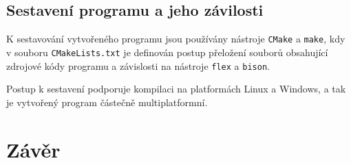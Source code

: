 \documentclass[12pt, a4paper]{article}
\let\oldsection\section
\renewcommand\section{\clearpage\oldsection}
\begin{document}
\subsection{Sestavení programu a jeho závilosti}
K sestavování vytvořeného programu jsou používány nástroje \texttt{CMake} a \texttt{make}, kdy v souboru \texttt{CMakeLists.txt} je definován postup přeložení souborů obsahující zdrojové kódy programu a závislosti na nástroje \texttt{flex} a \texttt{bison}.

Postup k sestavení podporuje kompilaci na platformách Linux a Windows, a tak je vytvořený program částečně multiplatformní.




\section{Závěr}	

\end{document}
